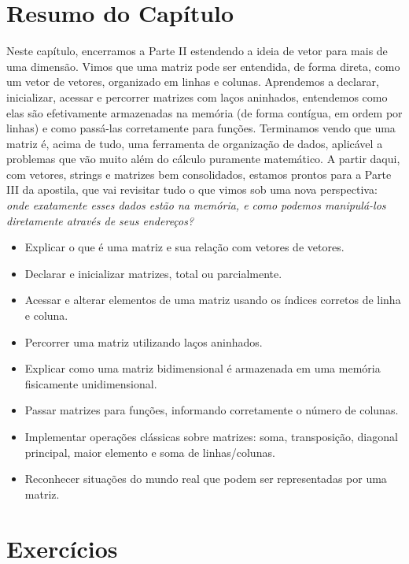\documentclass[12pt,a4paper,oneside]{extreport}
\begin{document}
\section*{Resumo do Capítulo}
Neste capítulo, encerramos a Parte II estendendo a ideia de vetor para mais de uma dimensão. Vimos que uma matriz pode ser entendida, de forma direta, como um vetor de vetores, organizado em linhas e colunas. Aprendemos a declarar, inicializar, acessar e percorrer matrizes com laços aninhados, entendemos como elas são efetivamente armazenadas na memória (de forma contígua, em ordem por linhas) e como passá-las corretamente para funções. Terminamos vendo que uma matriz é, acima de tudo, uma ferramenta de organização de dados, aplicável a problemas que vão muito além do cálculo puramente matemático. A partir daqui, com vetores, strings e matrizes bem consolidados, estamos prontos para a Parte III da apostila, que vai revisitar tudo o que vimos sob uma nova perspectiva: \textit{onde exatamente esses dados estão na memória, e como podemos manipulá-los diretamente através de seus endereços?}

\begin{objetivos}
\begin{itemize}
    \item Explicar o que é uma matriz e sua relação com vetores de vetores.
    \item Declarar e inicializar matrizes, total ou parcialmente.
    \item Acessar e alterar elementos de uma matriz usando os índices corretos de linha e coluna.
    \item Percorrer uma matriz utilizando laços aninhados.
    \item Explicar como uma matriz bidimensional é armazenada em uma memória fisicamente unidimensional.
    \item Passar matrizes para funções, informando corretamente o número de colunas.
    \item Implementar operações clássicas sobre matrizes: soma, transposição, diagonal principal, maior elemento e soma de linhas/colunas.
    \item Reconhecer situações do mundo real que podem ser representadas por uma matriz.
\end{itemize}
\end{objetivos}

\section*{Exercícios}
\end{document}

